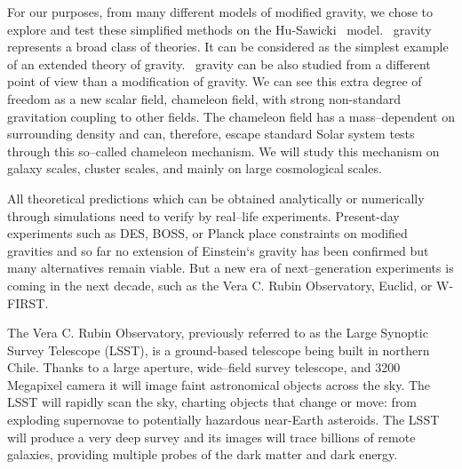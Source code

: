 For our purposes, from many different models of modified gravity, we chose to explore and test these simplified methods on the Hu-Sawicki \fR\ model. \fR\ gravity represents a broad class of theories. It can be considered as the simplest example of an extended theory of gravity. \fR\ gravity can be also studied from a different point of view than a modification of gravity. We can see this extra degree of freedom as a new scalar field, chameleon field, with strong non-standard gravitation coupling to other fields. The chameleon field has a mass--dependent on surrounding density and can, therefore, escape standard Solar system tests through this so--called chameleon mechanism. We will study this mechanism on galaxy scales, cluster scales, and mainly on large cosmological scales.

All theoretical predictions which can be obtained analytically or numerically through simulations need to verify by real--life experiments. Present-day experiments such as DES, BOSS, or Planck place constraints on modified gravities and so far no extension of Einstein`s gravity has been confirmed but many alternatives remain viable. But a new era of next--generation experiments is coming in the next decade, such as the Vera C. Rubin Observatory, Euclid, or W-FIRST.

The Vera C. Rubin Observatory, previously referred to as the Large Synoptic Survey Telescope (LSST), is a ground-based telescope being built in northern Chile. Thanks to a large aperture, wide--field survey telescope, and 3200 Megapixel camera it will image faint astronomical objects across the sky. The LSST will rapidly scan the sky, charting objects that change or move: from exploding supernovae to potentially hazardous near-Earth asteroids. The LSST will produce a very deep survey and its images will trace billions of remote galaxies, providing multiple probes of the dark matter and dark energy.

